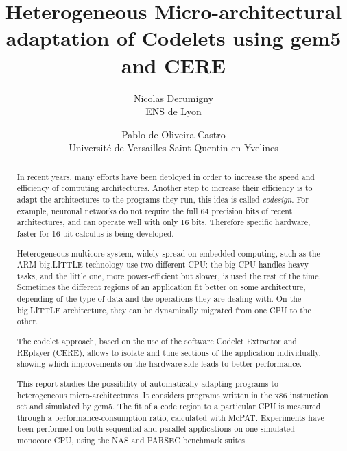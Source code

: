 \documentclass{article}
\title{Heterogeneous Micro-architectural adaptation of Codelets using gem5 and CERE}
\author{Nicolas Derumigny \\
\small ENS de Lyon 
\and Pablo de Oliveira Castro\\ 
\small Université de Versailles Saint-Quentin-en-Yvelines}
\date{}
\begin{document}
\maketitle

\smallskip

\begin{abstract}
In recent years, many efforts have been deployed in order to increase the speed and efficiency of computing architectures. Another step to increase their efficiency is to adapt the architectures to the programs they run, this idea is called \emph{codesign}. For example, neuronal networks do not require the full 64 precision bits of recent architectures, and can operate well with only 16 bits. Therefore specific hardware, faster for 16-bit calculus is being developed.


Heterogeneous multicore system, widely spread on embedded computing, such as the ARM big.LITTLE technology use two different CPU: the big CPU handles heavy tasks, and the little one, more power-efficient but slower, is used the rest of the time. Sometimes the different regions of an application fit better on some architecture, depending of the type of data and the operations they are dealing with. On the big.LITTLE architecture, they can be dynamically migrated from one CPU to the other. 

The codelet approach, based on the use of the software Codelet Extractor and REplayer (CERE), allows to isolate and tune sections of the application individually, showing which improvements on the hardware side leads to better performance. 


This report studies the possibility of automatically adapting programs to heterogeneous micro-architectures. It considers programs written in the x86 instruction set and simulated by gem5. The fit of a code region to a particular CPU is measured through a performance-consumption ratio, calculated with McPAT.
Experiments have been performed on both sequential and parallel applications on one simulated monocore CPU, using the NAS and PARSEC benchmark suites. 

\end{abstract}
\end{document}

